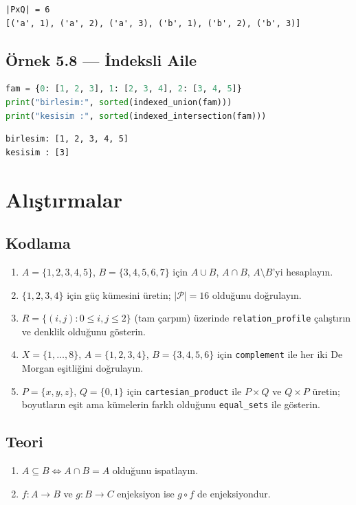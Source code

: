 \begin{verbatim}
|PxQ| = 6
[('a', 1), ('a', 2), ('a', 3), ('b', 1), ('b', 2), ('b', 3)]
\end{verbatim}

\subsection*{Örnek 5.8 — İndeksli Aile}

\begin{lstlisting}[language=Python]
fam = {0: [1, 2, 3], 1: [2, 3, 4], 2: [3, 4, 5]}
print("birlesim:", sorted(indexed_union(fam)))
print("kesisim :", sorted(indexed_intersection(fam)))
\end{lstlisting}

\begin{verbatim}
birlesim: [1, 2, 3, 4, 5]
kesisim : [3]
\end{verbatim}

\section{Alıştırmalar}

\subsection*{Kodlama}

\begin{enumerate}[label=K\arabic*.]
\item $A = \{1,2,3,4,5\}$, $B = \{3,4,5,6,7\}$ için $A\cup B$, $A\cap B$,
      $A\setminus B$'yi hesaplayın.
\item $\{1,2,3,4\}$ için güç kümesini üretin; $|\mathcal{P}|=16$ olduğunu doğrulayın.
\item $R = \{(i,j): 0\le i,j \le 2\}$ (tam çarpım) üzerinde \texttt{relation\_profile}
      çalıştırın ve denklik olduğunu gösterin.
\item $X=\{1,\dots,8\}$, $A=\{1,2,3,4\}$, $B=\{3,4,5,6\}$ için \texttt{complement}
      ile her iki De Morgan eşitliğini doğrulayın.
\item $P=\{x,y,z\}$, $Q=\{0,1\}$ için \texttt{cartesian\_product} ile $P\times Q$
      ve $Q\times P$ üretin; boyutların eşit ama kümelerin farklı olduğunu
      \texttt{equal\_sets} ile gösterin.
\end{enumerate}

\subsection*{Teori}

\begin{enumerate}[label=T\arabic*.]
\item $A \subseteq B \Leftrightarrow A \cap B = A$ olduğunu ispatlayın.
\item $f: A \to B$ ve $g: B \to C$ enjeksiyon ise $g \circ f$ de enjeksiyondur.
\end{enumerate}
